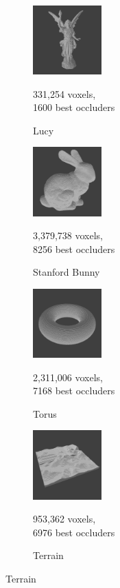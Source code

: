 \documentclass[conference]{IEEEtran}
\begin{document}
\begin{figure}
    \begin{subfigure}{100px}
        \includegraphics[width=100px]{images/model-lucy.jpg}
        \caption{Lucy}
        \parbox{\linewidth}{\centering\footnotesize 331,254 voxels,\\ 1600 best occluders}
    \end{subfigure}
    \begin{subfigure}{100px}
        \includegraphics[width=100px]{images/model-bunny.jpg}
        \caption{Stanford Bunny}
        \parbox{\linewidth}{\centering\footnotesize 3,379,738 voxels,\\ 8256 best occluders}
    \end{subfigure}
    \begin{subfigure}{100px}
        \includegraphics[width=100px]{images/model-torus.jpg}
        \caption{Torus}
        \parbox{\linewidth}{\centering\footnotesize 2,311,006 voxels,\\ 7168 best occluders}
    \end{subfigure}
    \begin{subfigure}{100px}
        \includegraphics[width=100px]{images/model-terrain.jpg}
        \caption{Terrain}
        \parbox{\linewidth}{\centering\footnotesize 953,362 voxels,\\ 6976 best occluders}

\end{subfigure}
\end{figure}
\end{document}
